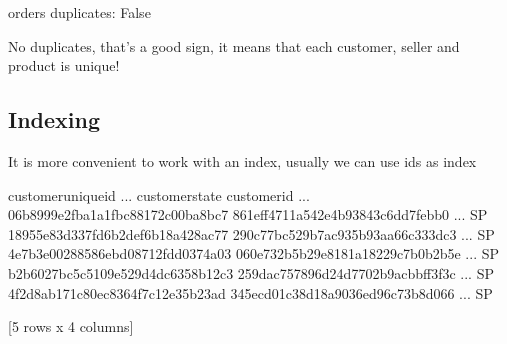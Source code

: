 \documentclass[letterpaper,10pt,english]{jupyterBook}
\begin{document}
\begin{sphinxVerbatim}[commandchars=\\\{\}]
orders duplicates: 
False
\end{sphinxVerbatim}

\sphinxAtStartPar
No duplicates, that’s a good sign, it means that each customer, seller and product is unique!


\subsection{Indexing}
\label{\detokenize{c7_case_studies/Olist:indexing}}
\sphinxAtStartPar
It is more convenient to work with an index, usually we can use ids as index

\begin{sphinxVerbatim}[commandchars=\\\{\}]
  
\end{sphinxVerbatim}

\begin{sphinxVerbatim}[commandchars=\\\{\}]
                                                customer\PYGZus{}unique\PYGZus{}id  ...  customer\PYGZus{}state
customer\PYGZus{}id                                                         ...                
06b8999e2fba1a1fbc88172c00ba8bc7  861eff4711a542e4b93843c6dd7febb0  ...              SP
18955e83d337fd6b2def6b18a428ac77  290c77bc529b7ac935b93aa66c333dc3  ...              SP
4e7b3e00288586ebd08712fdd0374a03  060e732b5b29e8181a18229c7b0b2b5e  ...              SP
b2b6027bc5c5109e529d4dc6358b12c3  259dac757896d24d7702b9acbbff3f3c  ...              SP
4f2d8ab171c80ec8364f7c12e35b23ad  345ecd01c38d18a9036ed96c73b8d066  ...              SP

[5 rows x 4 columns]
\end{sphinxVerbatim}

\begin{sphinxVerbatim}[commandchars=\\\{\}]
  
\end{sphinxVerbatim}
\end{document}
